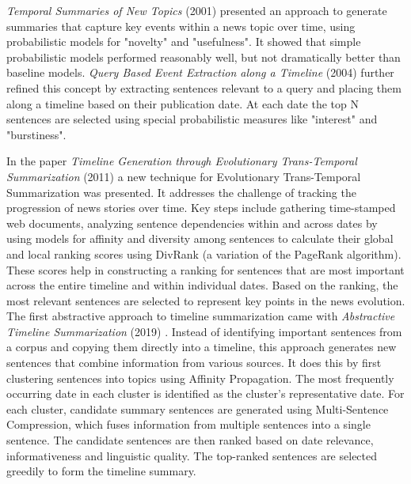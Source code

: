 \documentclass[a4paper,10pt]{report}
\begin{document}
\textit{Temporal Summaries of New Topics} (2001) \cite{AllanTemporalSummaries} presented an approach to generate summaries that capture key events within a news topic over time, using probabilistic models for "novelty" and "usefulness". It showed that simple probabilistic models performed reasonably well, but not dramatically better than baseline models. \textit{Query Based Event Extraction along a Timeline} (2004) \cite{ChieuQueryBasedEvent} further refined this concept by extracting sentences relevant to a query and placing them along a timeline based on their publication date. At each date the top N sentences are selected using special probabilistic measures like "interest" and "burstiness".

In the paper \textit{Timeline Generation through Evolutionary Trans-Temporal Summarization} (2011) \cite{YanTimelineGeneration} a new technique for Evolutionary Trans-Temporal Summarization was presented. It addresses the challenge of tracking the progression of news stories over time. Key steps include gathering time-stamped web documents, analyzing sentence dependencies within and across dates by using models for affinity and diversity among sentences to calculate their global and local ranking scores using DivRank (a variation of the PageRank algorithm). These scores help in constructing a ranking for sentences that are most important across the entire timeline and within individual dates. Based on the ranking, the most relevant sentences are selected to represent key points in the news evolution. \\

The first abstractive approach to timeline summarization came with \textit{Abstractive Timeline Summarization} (2019) \cite{SteenAbstractiveTimeline}. Instead of identifying important sentences from a corpus and copying them directly into a timeline, this approach generates new sentences that combine information from various sources. It does this by first clustering sentences into topics using Affinity Propagation. The most frequently occurring date in each cluster is identified as the cluster's representative date. For each cluster, candidate summary sentences are generated using Multi-Sentence Compression, which fuses information from multiple sentences into a single sentence. The candidate sentences are then ranked based on date relevance, informativeness and linguistic quality. The top-ranked sentences are selected greedily to form the timeline summary. \\
\end{document}
